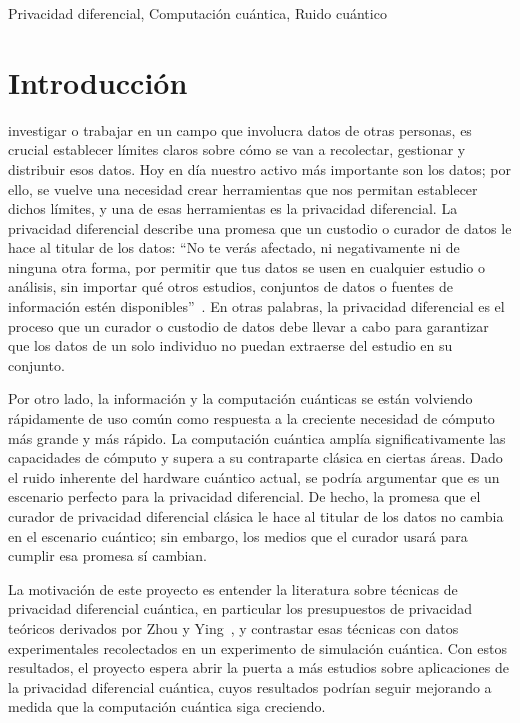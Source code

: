 \documentclass{ieeeaccess}
\begin{document}
\begin{keywords}
Privacidad diferencial, Computación cuántica, Ruido cuántico
\end{keywords}

\titlepgskip=-15pt

\maketitle

\section{Introducción}
\label{sec:introduction}
 investigar o trabajar en un campo que involucra datos de otras personas, es crucial establecer límites claros sobre cómo se van a recolectar, gestionar y distribuir esos datos. Hoy en día nuestro activo más importante son los datos; por ello, se vuelve una necesidad crear herramientas que nos permitan establecer dichos límites, y una de esas herramientas es la privacidad diferencial. La privacidad diferencial describe una promesa que un custodio o curador de datos le hace al titular de los datos: ``No te verás afectado, ni negativamente ni de ninguna otra forma, por permitir que tus datos se usen en cualquier estudio o análisis, sin importar qué otros estudios, conjuntos de datos o fuentes de información estén disponibles''~\cite{dwork2014algorithmic}. En otras palabras, la privacidad diferencial es el proceso que un curador o custodio de datos debe llevar a cabo para garantizar que los datos de un solo individuo no puedan extraerse del estudio en su conjunto.

Por otro lado, la información y la computación cuánticas se están volviendo rápidamente de uso común como respuesta a la creciente necesidad de cómputo más grande y más rápido. La computación cuántica amplía significativamente las capacidades de cómputo y supera a su contraparte clásica en ciertas áreas. Dado el ruido inherente del hardware cuántico actual, se podría argumentar que es un escenario perfecto para la privacidad diferencial. De hecho, la promesa que el curador de privacidad diferencial clásica le hace al titular de los datos no cambia en el escenario cuántico; sin embargo, los medios que el curador usará para cumplir esa promesa sí cambian.

La motivación de este proyecto es entender la literatura sobre técnicas de privacidad diferencial cuántica, en particular los presupuestos de privacidad teóricos derivados por Zhou y Ying~\cite{zhou2017differential}, y contrastar esas técnicas con datos experimentales recolectados en un experimento de simulación cuántica. Con estos resultados, el proyecto espera abrir la puerta a más estudios sobre aplicaciones de la privacidad diferencial cuántica, cuyos resultados podrían seguir mejorando a medida que la computación cuántica siga creciendo.
\end{document}
